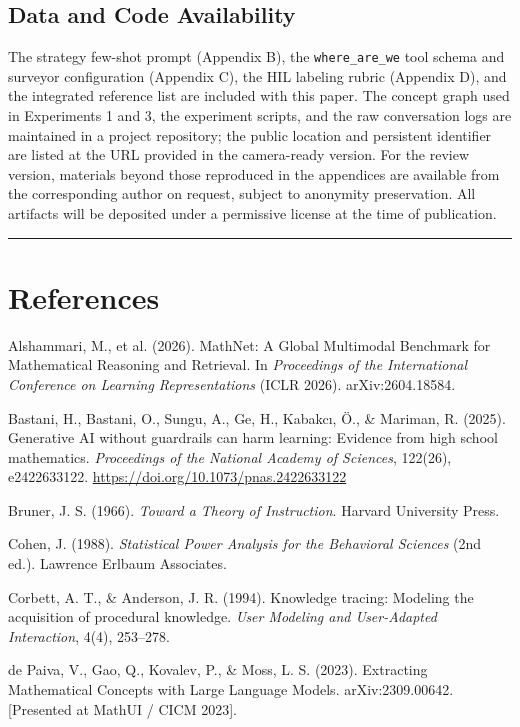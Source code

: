 \documentclass[
]{article}
\begin{document}
\subsection{Data and Code Availability}\label{data-and-code-availability}

The strategy few-shot prompt (Appendix B), the \texttt{where\_are\_we} tool schema and surveyor configuration (Appendix C), the HIL labeling rubric (Appendix D), and the integrated reference list are included with this paper. The concept graph used in Experiments 1 and 3, the experiment scripts, and the raw conversation logs are maintained in a project repository; the public location and persistent identifier are listed at the URL provided in the camera-ready version. For the review version, materials beyond those reproduced in the appendices are available from the corresponding author on request, subject to anonymity preservation. All artifacts will be deposited under a permissive license at the time of publication.

\begin{center}\rule{0.5\linewidth}{0.5pt}\end{center}

\section{References}\label{references}

Alshammari, M., et al. (2026). MathNet: A Global Multimodal Benchmark for Mathematical Reasoning and Retrieval. In \emph{Proceedings of the International Conference on Learning Representations} (ICLR 2026). arXiv:2604.18584.

Bastani, H., Bastani, O., Sungu, A., Ge, H., Kabakcı, Ö., \& Mariman, R. (2025). Generative AI without guardrails can harm learning: Evidence from high school mathematics. \emph{Proceedings of the National Academy of Sciences}, 122(26), e2422633122. \url{https://doi.org/10.1073/pnas.2422633122}

Bruner, J. S. (1966). \emph{Toward a Theory of Instruction}. Harvard University Press.

Cohen, J. (1988). \emph{Statistical Power Analysis for the Behavioral Sciences} (2nd ed.). Lawrence Erlbaum Associates.

Corbett, A. T., \& Anderson, J. R. (1994). Knowledge tracing: Modeling the acquisition of procedural knowledge. \emph{User Modeling and User-Adapted Interaction}, 4(4), 253--278.

de Paiva, V., Gao, Q., Kovalev, P., \& Moss, L. S. (2023). Extracting Mathematical Concepts with Large Language Models. arXiv:2309.00642. {[}Presented at MathUI / CICM 2023{]}.
\end{document}
